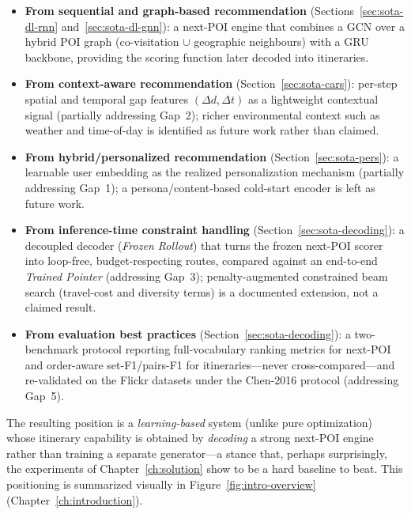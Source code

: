 \begin{itemize}
  \item \textbf{From sequential and graph-based recommendation} (Sections~\ref{sec:sota-dl-rnn} and~\ref{sec:sota-dl-gnn}): a next-POI engine that combines a GCN over a hybrid POI graph (co-visitation $\cup$ geographic neighbours) with a GRU backbone, providing the scoring function later decoded into itineraries.

  \item \textbf{From context-aware recommendation} (Section~\ref{sec:sota-cars}): per-step spatial and temporal gap features $(\Delta d,\Delta t)$ as a lightweight contextual signal (partially addressing Gap~2); richer environmental context such as weather and time-of-day is identified as future work rather than claimed.

  \item \textbf{From hybrid/personalized recommendation} (Section~\ref{sec:sota-pers}): a learnable user embedding as the realized personalization mechanism (partially addressing Gap~1); a persona/content-based cold-start encoder is left as future work.

  \item \textbf{From inference-time constraint handling} (Section~\ref{sec:sota-decoding}): a decoupled decoder (\emph{Frozen Rollout}) that turns the frozen next-POI scorer into loop-free, budget-respecting routes, compared against an end-to-end \emph{Trained Pointer} (addressing Gap~3); penalty-augmented constrained beam search (travel-cost and diversity terms) is a documented extension, not a claimed result.

  \item \textbf{From evaluation best practices} (Section~\ref{sec:sota-decoding}): a two-benchmark protocol reporting full-vocabulary ranking metrics for next-POI and order-aware set-F1/pairs-F1 for itineraries---never cross-compared---and re-validated on the Flickr datasets under the Chen-2016 protocol (addressing Gap~5).
\end{itemize}

The resulting position is a \emph{learning-based} system (unlike pure optimization) whose itinerary capability is obtained by \emph{decoding} a strong next-POI engine rather than training a separate generator---a stance that, perhaps surprisingly, the experiments of Chapter~\ref{ch:solution} show to be a hard baseline to beat. This positioning is summarized visually in Figure~\ref{fig:intro-overview} (Chapter~\ref{ch:introduction}).

